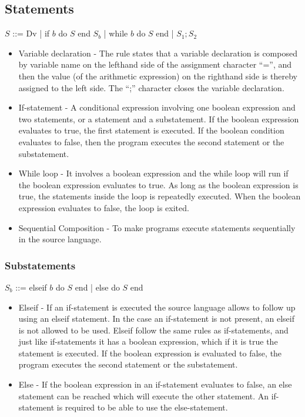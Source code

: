 \subsection{Statements}

$S$ ::= Dv | if $b$ do $S$ end $S_b$ | while $b$ do $S$ end | $S_1 ; S_2$

\begin{itemize}
	\item Variable declaration - The rule states that a variable declaration is composed by variable name on the lefthand side of the assignment character ``='', and then the value (of the arithmetic expression) on the righthand side is thereby assigned to the left side. The ``;'' character closes the variable declaration.
	\item If-statement -  A conditional expression involving one boolean expression and two statements, or a statement and a substatement. If the boolean expression evaluates to true, the first statement is executed. If the boolean condition evaluates to false, then the program executes the second statement or the substatement.

	\item While loop - It involves a boolean expression and the while loop will run if the boolean expression evaluates to true. As long as the boolean expression is true, the statements inside the loop is repeatedly executed. When the boolean expression evaluates to false, the loop is exited.
	\item Sequential Composition - To make programs execute statements sequentially in the source language.
\end{itemize}

\subsubsection{Substatements}

$S_b$ ::= {elseif $b$ do $S$ end} | else do $S$ end

\begin{itemize}
	\item Elseif - If an if-statement is executed the source language allows to follow up using an elseif statement. In the case an if-statement is not present, an elseif is not allowed to be used. Elseif follow the same rules as if-statements, and just like if-statements it has a boolean expression, which if it is true the statement is executed. If the boolean expression is evaluated to false, the program executes the second statement or the substatement.
	\item Else - If the boolean expression in an if-statement evaluates to false, an else statement can be reached which will execute the other statement. An if-statement is required to be able to use the else-statement.
\end{itemize}


